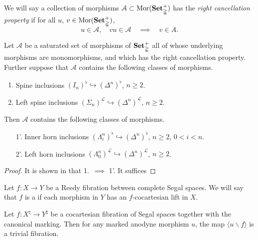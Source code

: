 \documentclass[main.tex]{subfiles}
\begin{document}
We will say a collection of morphisms $\mathcal{A} \subset \mathrm{Mor}(\mathbf{Set}_{\mathbb{\Delta}}^{+})$ has the \emph{right cancellation property} if for all $u$, $v \in \mathrm{Mor}(\mathbf{Set}_{\mathbb{\Delta}}^{+})$,
\begin{equation*}
  u \in \mathcal{A},\quad vu \in \mathcal{A} \quad \implies \quad v \in A.
\end{equation*}

\begin{lemma}
  Let $\mathcal{A}$ be a saturated set of morphisms of $\mathbf{Set}_{\mathbb{\Delta}}^{+}$ all of whose underlying morphisms are monomorphisms, and which has the right cancellation property. Further suppose that $\mathcal{A}$ contains the following classes of morphisms.
  \begin{enumerate}
    \item Spine inclusions $(I_{n})^{\flat} \hookrightarrow (\Delta^{n})^{\flat}$, $n \geq 2$.

    \item Left spine inclusions $(\Sigma_{n})^{\mathcal{L}} \hookrightarrow (\Delta^{n})^{\mathcal{L}}$, $n \geq 2$.
  \end{enumerate}

  Then $\mathcal{A}$ contains the following classes of morphisms.
  \begin{enumerate}
    \item[1'.] Inner horn inclusions $(\Lambda^{n}_{i})^{\flat} \hookrightarrow (\Delta^{n})^{\flat}$, $n \geq 2$, $0 < i < n$.

    \item[2'.] Left horn inclusions $(\Lambda^{n}_{0})^{\mathcal{L}} \hookrightarrow (\Delta^{n})^{\mathcal{L}}$, $n \geq 2$.
  \end{enumerate}
\end{lemma}
\begin{proof}
  It is shown in \cite{Joyal2006} that 1.\ $\implies$ 1'. It suffices
\end{proof}

\begin{definition}
  \label{def:cocartesian_fibration_between_complete_segal_spaces}
  Let $f\colon X \to Y$ be a Reedy fibration between complete Segal spaces. We will say that $f$ is a  if each morphism in $Y$ has an $f$-cocartesian lift in $X$.
\end{definition}

\begin{theorem}
  Let $f\colon X^{\natural} \to Y^{\sharp}$ be a cocartesian fibration of Segal spaces together with the canonical marking. Then for any marked anodyne morphism $u$, the map $\langle u \backslash f \rangle$ is a trivial fibration.
\end{theorem}
\end{document}
